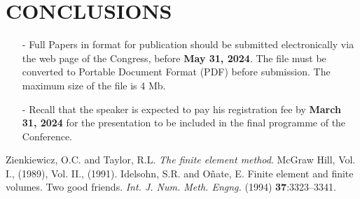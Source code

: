 \documentclass{wccm2024}
\begin{document}
\section{CONCLUSIONS}

\begin{itemize}
\item[-] Full Papers in format for publication should be submitted electronically via the web page of the Congress, before \textbf{May 31, 2024}. The file must be converted to Portable Document Format (PDF) before submission. The maximum size of the file is 4 Mb.

\item[-] Recall that the speaker is expected to pay his registration fee by \textbf{March 31, 2024} for the presentation to be included in the final programme of the Conference.
\end{itemize}

\begin{thebibliography}{99}
  Zienkiewicz, O.C. and  Taylor, R.L. \textit{The finite element method}. McGraw Hill,
Vol. I., (1989), Vol. II., (1991).
 Idelsohn, S.R. and O\~{n}ate, E. Finite element and finite volumes. Two good friends.
\textit{Int. J. Num. Meth. Engng.} (1994) \textbf{37}:3323--3341.
\end{thebibliography}
\end{document}
